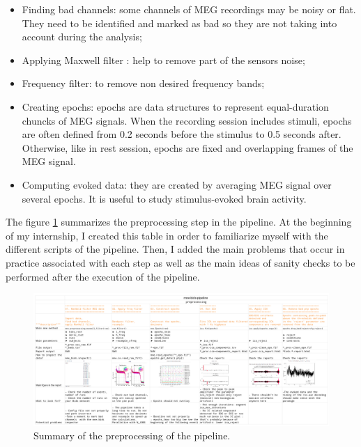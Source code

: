 \begin{itemize}
    \item Finding bad channels: some channels of MEG recordings may be noisy or flat. They need to be identified and marked as bad so they are not taking into account during the analysis;
    \item Applying Maxwell filter : help to remove part of the sensors noise;
    \item Frequency filter: to remove non desired frequency bands;
    \item Creating epochs: epochs are data structures to represent equal-duration chuncks of MEG signals. When the recording session includes stimuli, epochs are often defined from 0.2 seconds before the stimulus to 0.5 seconds after. Otherwise, like in rest session, epochs are fixed and overlapping frames of the MEG signal.
    \item Computing evoked data: they are created by averaging MEG signal over several epochs. It is useful to study stimulus-evoked brain activity.
\end{itemize}


The figure \ref{cheat_sheet} summarizes the preprocessing step in the pipeline. At the beginning of my internship, I created this table in order to familiarize myself with the different scripts of the pipeline. Then, I added the main problems that occur in practice associated with each step as well as the main ideas of sanity checks to be performed after the execution of the pipeline.

\begin{figure}[ht]
    \centering
    \includegraphics[width=15cm]{images_report/preprocessing/cheatsheet preprocessing.png}
    \caption[Summary of the preprocessing of the pipeline.]%
    {Summary of the preprocessing of the pipeline.}
    \label{cheat_sheet}
\end{figure}



